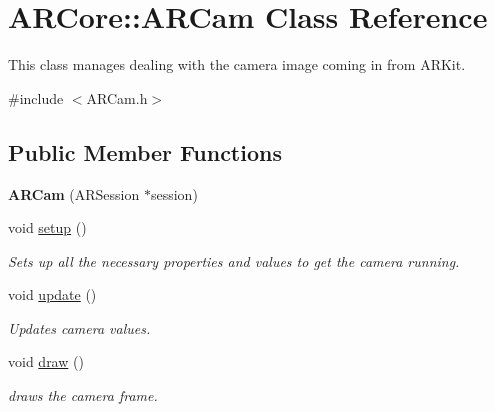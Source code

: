 \hypertarget{class_a_r_core_1_1_a_r_cam}{}\section{A\+R\+Core\+:\+:A\+R\+Cam Class Reference}
\label{class_a_r_core_1_1_a_r_cam}


This class manages dealing with the camera image coming in from A\+R\+Kit.  




{\ttfamily \#include $<$A\+R\+Cam.\+h$>$}

\subsection*{Public Member Functions}
\begin{DoxyCompactItemize}
\item 
\mbox{\label{class_a_r_core_1_1_a_r_cam_aac3da0758960b1cc5787eae0b7efffe1}} 
{\bfseries A\+R\+Cam} (A\+R\+Session $\ast$session)
\item 
\mbox{\label{class_a_r_core_1_1_a_r_cam_ad34c392873aa518e9c560d1af34f2b7a}} 
void \hyperlink{class_a_r_core_1_1_a_r_cam_ad34c392873aa518e9c560d1af34f2b7a}{setup} ()
\begin{DoxyCompactList}\small\item\em Sets up all the necessary properties and values to get the camera running. \end{DoxyCompactList}\item 
\mbox{\label{class_a_r_core_1_1_a_r_cam_a900296e2ff23dfa7deb8bfab58fd0729}} 
void \hyperlink{class_a_r_core_1_1_a_r_cam_a900296e2ff23dfa7deb8bfab58fd0729}{update} ()
\begin{DoxyCompactList}\small\item\em Updates camera values. \end{DoxyCompactList}\item 
\mbox{\label{class_a_r_core_1_1_a_r_cam_ac6506992ee88e0acd20d851849ebfa18}} 
void \hyperlink{class_a_r_core_1_1_a_r_cam_ac6506992ee88e0acd20d851849ebfa18}{draw} ()
\begin{DoxyCompactList}\small\item\em draws the camera frame. \end{DoxyCompactList}\item 

\end{DoxyCompactItemize}
